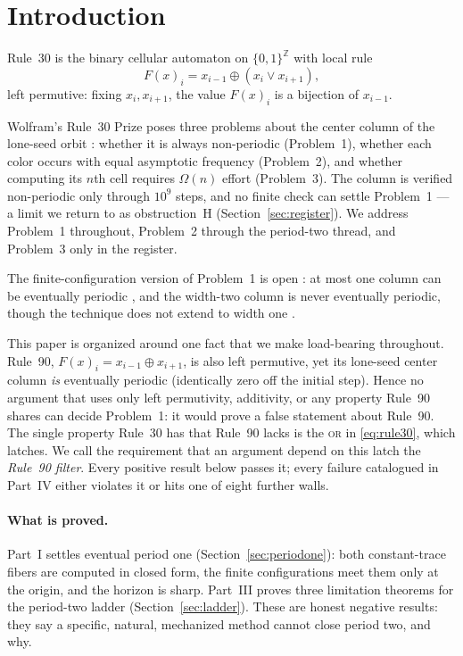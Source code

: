 \documentclass[11pt]{article}
\theoremstyle{definition}
\begin{document}
\section{Introduction}

Rule~30 is the binary cellular automaton on $\{0,1\}^{\mathbb Z}$ with local rule
\begin{equation}\label{eq:rule30}
 F(x)_i=x_{i-1}\oplus(x_i\lor x_{i+1}),
\end{equation}
left permutive: fixing $x_i,x_{i+1}$, the value $F(x)_i$ is a bijection of
$x_{i-1}$.

Wolfram's Rule~30 Prize poses three problems about the center column of the
lone-seed orbit \cite{wolfram}: whether it is always non-periodic
(Problem~1), whether each color occurs with equal asymptotic frequency
(Problem~2), and whether computing its $n$th cell requires $\Omega(n)$
effort (Problem~3). The column is verified non-periodic only through $10^9$
steps, and no finite check can settle Problem~1 --- a limit we return to as
obstruction~H (Section~\ref{sec:register}). We address Problem~1 throughout,
Problem~2 through the period-two thread, and Problem~3 only in the register.

The finite-configuration version of Problem~1 is open \cite{kopra-thesis}: at
most one column can be eventually periodic \cite[Thm.~2b]{jen1986}\cite[Prop.~3]{jen},
and the width-two column is never eventually periodic, though the technique
does not extend to width one \cite{kopra}.

This paper is organized around one fact that we make load-bearing throughout.
Rule~90, $F(x)_i = x_{i-1}\oplus x_{i+1}$, is also left permutive, yet its
lone-seed center column \emph{is} eventually periodic (identically zero off the
initial step). Hence no argument that uses only left permutivity, additivity, or
any property Rule~90 shares can decide Problem~1: it would prove a false
statement about Rule~90. The single property Rule~30 has that Rule~90 lacks is
the \textsc{or} in \eqref{eq:rule30}, which latches. We call the requirement that
an argument depend on this latch the \emph{Rule~90 filter}. Every positive
result below passes it; every failure catalogued in Part~IV either violates it
or hits one of eight further walls.

\paragraph{What is proved.} Part~I settles eventual period one
(Section~\ref{sec:periodone}): both constant-trace fibers are computed in closed
form, the finite configurations meet them only at the origin, and the horizon is
sharp. Part~III proves three limitation theorems for the period-two ladder
(Section~\ref{sec:ladder}). These are honest negative results: they say a
specific, natural, mechanized method cannot close period two, and why.
\end{document}
